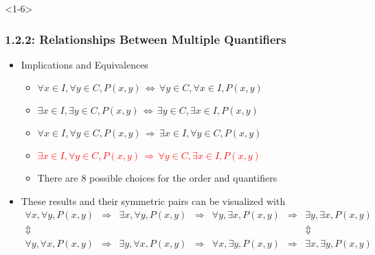 \documentclass[10pt,english,aspectratio=169]{beamer}
\begin{document}
\begin{frame}<1-6> \frametitle{1.2.2: Relationships Between Multiple Quantifiers}

\begin{itemize}
\setlength\itemsep{5mm}
\item<1-> Implications and Equivalences \vspace{1mm}
\begin{itemize}
 \setlength\itemsep{1.5mm}
 \item<1-> $\forall x\!\in\! I, \forall y\!\in\! C, P(x,y)  \,\Leftrightarrow\, \forall y\!\in\! C, \forall x\!\in\! I, P(x,y)$
 \item<2-> $\exists x\!\in\! I, \exists y\!\in\! C, P(x,y) \,\Leftrightarrow\, \exists y\!\in\! C, \exists x\!\in\! I, P(x,y)$
 \item<3-> $\forall x\!\in\! I, \forall y\!\in\! C, P(x,y) \,\Rightarrow\, \exists x\!\in\! I, \forall y\!\in\! C, P(x,y)$
 \item<4-> \textcolor{red}{$\exists x\!\in\! I, \forall y\!\in\! C, P(x,y) \,\Rightarrow\, \forall y\!\in\! C, \exists x\!\in\! I, P(x,y)$}
 \item<5-> There are 8 possible choices for the order and quantifiers
    
\end{itemize}

 \item<6-> These results and their symmetric pairs can be visualized with \\[-3mm] {\small \color{blue} \[ \begin{array}{ccccccc}
   \forall x, \forall y, P(x,y) & \Rightarrow & \exists x, \forall y, P(x,y) & \Rightarrow & \forall y, \exists x, P(x,y) & \Rightarrow & \exists y, \exists x, P(x,y) \\
   \Updownarrow &&&&&& \Updownarrow \\
   \forall y, \forall x, P(x,y) & \Rightarrow & \exists y, \forall x, P(x,y) & \Rightarrow & \forall x, \exists y, P(x,y) & \Rightarrow & \exists x, \exists y, P(x,y)
   \end{array} \]}

\end{itemize}



\end{frame}
\end{document}
